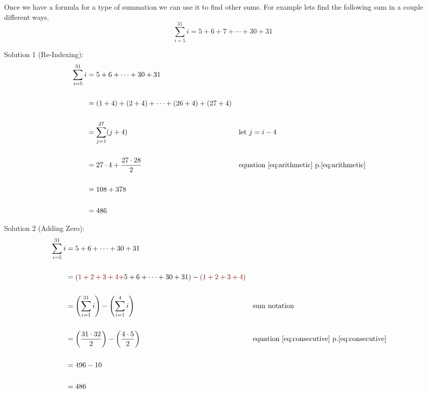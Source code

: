 \begin{exposition}\label{exp:usingformulas} Once we have a formula for a type of summation we can use it to find other sums.
For example lets find the following sum in a couple different ways.
    \[\sum_{i=5}^{31} i = 5+6+7+\cdots+30+31\]

Solution 1 (Re-Indexing):
\begin{align*}
    \sum_{i=5}^{31} i 
        &= 5+6+\cdots+30+31\\[15pt]
        &= (1+4)+(2+4)+\cdots+(26+4)+(27+4)\\[15pt]
        &= \sum_{j=1}^{27} (j+4) && \text{let}\ j=i-4\\[15pt]
        &=27\cdot 4+ \frac{27\cdot28}{2} && \text{equation \ref{eq:arithmetic} p.\pageref{eq:arithmetic}}\\[15pt]
        &=108+378\\[15pt]
        &=486
\end{align*}

Solution 2 (Adding Zero):
\begin{align*}
    \sum_{i=5}^{31} i 
        &= 5+6+\cdots+30+31\\[15pt]
        &= (\textcolor{secondaryaccent}{1+2+3+4+}5+6+\cdots+30+31)-\textcolor{secondaryaccent}{(1+2+3+4)}\\[15pt]
        &= \left(\sum_{i=1}^{31} i\right)-\left(\sum_{i=1}^{4} i\right) &&\text{sum notation}\\[15pt]
        &=\left(\frac{31\cdot 32}{2}\right)-\left(\frac{4\cdot 5}{2}\right) &&\text{equation \ref{eq:consecutive} p.\pageref{eq:consecutive}}\\[15pt]
        &=496-10\\[15pt]
        &=486
\end{align*}
\end{exposition}

\clearpage


